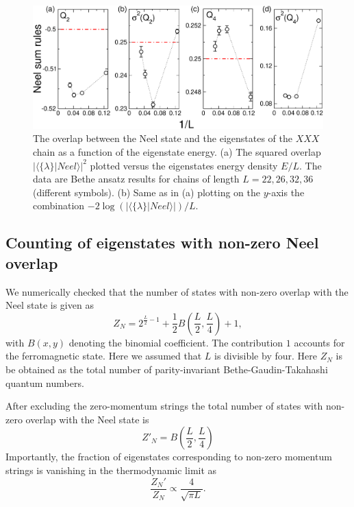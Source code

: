\documentclass[11pt]{iopart}
\begin{document}
\begin{figure}[t]
\begin{center}
\includegraphics[width=.9\textwidth]{./draft_figs/QAMC_Obs_Neel}
\end{center}
\caption{ The overlap between the Neel state and the eigenstates of the 
 $XXX$ chain as a function of the eigenstate energy. (a) The squared 
 overlap $|\langle\{\lambda\}|Neel\rangle|^2$ plotted versus the 
 eigenstates energy density $E/L$. The data are Bethe ansatz results 
 for chains of length $L=22,26,32,36$ (different symbols). (b) Same as 
 in (a) plotting on the $y$-axis the combination $-2\log(|\langle\{
 \lambda\}|Neel\rangle|)/L$. 
}
\label{fig4-neel-ener}
\end{figure}

\subsection{Counting of eigenstates with non-zero Neel overlap}

We numerically checked that the number of states with non-zero overlap 
with the Neel state is given as 
%
\begin{equation}
\label{Neel-count}
Z_N=2^{\frac{L}{2}-1}+\frac{1}{2}B\left(\frac{L}{2},
\frac{L}{4}\right)+1,
\end{equation}
%
with $B(x,y)$ denoting the binomial coefficient. The contribution $1$ 
accounts for the ferromagnetic state. Here 
we assumed that $L$ is divisible by four. Here $Z_N$ is be obtained 
as the total number of parity-invariant Bethe-Gaudin-Takahashi quantum 
numbers. 

After excluding the zero-momentum strings the total number of states 
with non-zero overlap with the Neel state is 
%
\begin{equation}
\label{neel-ov-count}
Z'_{N}=B\left(\frac{L}{2},\frac{L}{4}\right)
\end{equation}
%
Importantly, the fraction of eigenstates corresponding to non-zero momentum 
strings is vanishing in the thermodynamic limit as 
%
\begin{equation}
\frac{Z_N'}{Z_N}\propto\frac{4}{\sqrt{\pi L}}.
\end{equation}
%
\end{document}
